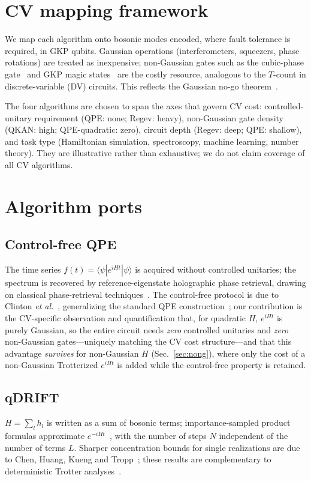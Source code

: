\documentclass[12pt]{iopart}
\begin{document}
\section{CV mapping framework}
We map each algorithm onto bosonic modes encoded, where fault tolerance is
required, in GKP qubits. Gaussian operations (interferometers, squeezers,
phase rotations) are treated as inexpensive; non-Gaussian gates such as the
cubic-phase gate~\cite{Marek2011,GKP2001} and GKP magic
states~\cite{Eaton2019,Konno2024} are the costly resource, analogous to the
$T$-count in discrete-variable (DV) circuits. This reflects the Gaussian
no-go theorem~\cite{Niset2009,Eisert2002}.

The four algorithms are chosen to span the axes that govern CV cost:
controlled-unitary requirement (QPE: none; Regev: heavy), non-Gaussian gate
density (QKAN: high; QPE-quadratic: zero), circuit depth (Regev: deep; QPE:
shallow), and task type (Hamiltonian simulation, spectroscopy, machine
learning, number theory). They are illustrative rather than exhaustive; we do
not claim coverage of all CV algorithms.

\section{Algorithm ports}
\subsection{Control-free QPE}
The time series $f(t)=\langle\psi|e^{iHt}|\psi\rangle$ is acquired without
controlled unitaries; the spectrum is recovered by reference-eigenstate
holographic phase retrieval, drawing on classical phase-retrieval
techniques~\cite{Fienup1982}. The control-free protocol is due to Clinton
\emph{et al.}~\cite{Clinton2026}, generalizing the standard QPE
construction~\cite{Kitaev1995}; our contribution is the CV-specific
observation and
quantification that, for quadratic $H$, $e^{iHt}$ is purely Gaussian, so the
entire circuit needs \emph{zero} controlled unitaries and \emph{zero}
non-Gaussian gates---uniquely matching the CV cost structure---and that this
advantage \emph{survives} for non-Gaussian $H$ (Sec.~\ref{sec:nong}), where
only the cost of a non-Gaussian Trotterized $e^{iHt}$ is added while the
control-free property is retained.

\subsection{qDRIFT}
$H=\sum_l h_l$ is written as a sum of bosonic terms; importance-sampled
product formulas approximate $e^{-iHt}$~\cite{Campbell2019}, with the
number of steps $N$ independent of the number of terms $L$. Sharper
concentration bounds for single realizations are due to Chen, Huang, Kueng
and Tropp~\cite{Chen2021}; these results are complementary to deterministic
Trotter analyses~\cite{Berry2015,Childs2021}.
\end{document}
